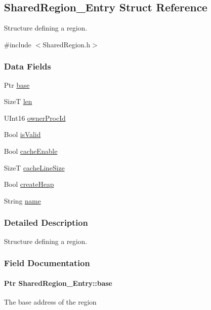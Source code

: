 \subsection{SharedRegion\_\-Entry Struct Reference}
\label{struct_shared_region___entry}


Structure defining a region.  




{\ttfamily \#include $<$SharedRegion.h$>$}

\subsubsection*{Data Fields}
\begin{DoxyCompactItemize}
\item 
Ptr \hyperlink{struct_shared_region___entry_a29bb9c93b43c2dd955f9fecbeb311987}{base}
\item 
SizeT \hyperlink{struct_shared_region___entry_ae71dcd036cf9b3dbfd8be2541322f64e}{len}
\item 
UInt16 \hyperlink{struct_shared_region___entry_a5b14dd19f62a192f1aa843063d1cbbda}{ownerProcId}
\item 
Bool \hyperlink{struct_shared_region___entry_ac2de956bb1b21e1372ba61a50c012ef5}{isValid}
\item 
Bool \hyperlink{struct_shared_region___entry_a3aeb47b20eb18950a8ae1fb09d1ebade}{cacheEnable}
\item 
SizeT \hyperlink{struct_shared_region___entry_ad083825edd4d4a99389328d87976e4c5}{cacheLineSize}
\item 
Bool \hyperlink{struct_shared_region___entry_a5db88d5d170d041d872527e9b5b71020}{createHeap}
\item 
String \hyperlink{struct_shared_region___entry_a1e87b924f55373c770d8d5add58b9267}{name}
\end{DoxyCompactItemize}


\subsubsection{Detailed Description}
Structure defining a region. 

\subsubsection{Field Documentation}
\paragraph[{base}]{\setlength{\rightskip}{0pt plus 5cm}Ptr {\bf SharedRegion\_\-Entry::base}}\hfill\label{struct_shared_region___entry_a29bb9c93b43c2dd955f9fecbeb311987}
The base address of the region 
